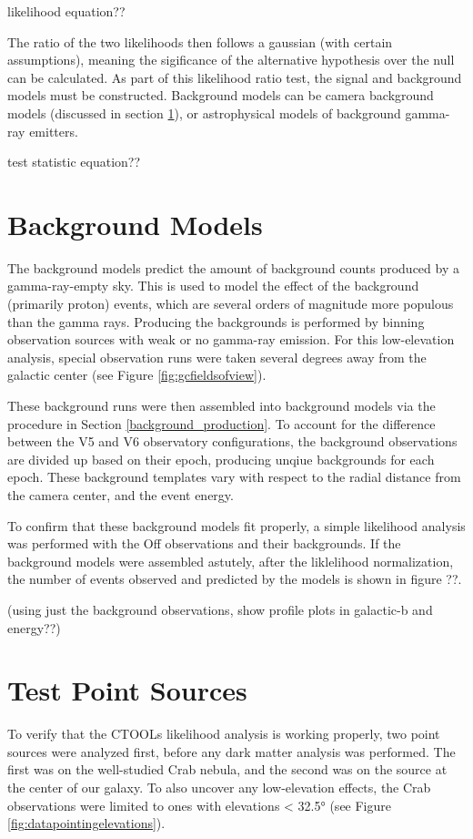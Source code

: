   {\color{red}likelihood equation??}
  
  
  The ratio of the two likelihoods then follows a gaussian (with certain assumptions), meaning the sigificance of the alternative hypothesis over the null can be calculated.
  As part of this likelihood ratio test, the signal and background models must be constructed.
  Background models can be camera background models (discussed in section \ref{sec:bkgmodels}), or astrophysical models of background gamma-ray emitters.

  {\color{red}test statistic equation??}

\section{Background Models}\label{sec:bkgmodels}
  The background models predict the amount of background counts produced by a gamma-ray-empty sky.
  This is used to model the effect of the background (primarily proton) events, which are several orders of magnitude more populous than the gamma rays.
  Producing the backgrounds is performed by binning observation sources with weak or no gamma-ray emission.
  For this low-elevation analysis, special observation runs were taken several degrees away from the galactic center (see Figure \ref{fig:gcfieldsofview}).

  These background runs were then assembled into background models via the procedure in Section \ref{background_production}.
  To account for the difference between the V5 and V6 observatory configurations, the background observations are divided up based on their epoch, producing unqiue backgrounds for each epoch.
  These background templates vary with respect to the radial distance from the camera center, and the event energy.

  To confirm that these background models fit properly, a simple likelihood analysis was performed with the Off observations and their backgrounds.
  If the background models were assembled astutely, after the liklelihood normalization, the number of events observed and predicted by the models is shown in {\color{red}figure ??}.

  {\color{red}(using just the background observations, show profile plots in galactic-b and energy??)}

\section{Test Point Sources}
  To verify that the CTOOLs likelihood analysis is working properly, two point sources were analyzed first, before any dark matter analysis was performed.
  The first was on the well-studied Crab nebula, and the second was on the source at the center of our galaxy.
  To also uncover any low-elevation effects, the Crab observations were limited to ones with elevations < \ang{32.5} (see Figure \ref{fig:datapointingelevations}).

